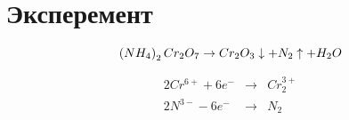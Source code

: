 \section{Эксперемент}

\begin{equation}
    \left( NH_4 \right)_2 Cr_2 O_7 \to 
    Cr_2O_3\downarrow + N_2\uparrow + H_2 O
\end{equation}

\begin{eqnarray}
    2Cr^{6+} + 6e^- &\to& Cr_2^{3+} \\
    2N^{3-} - 6e^{-} &\to& N_2
\end{eqnarray}




